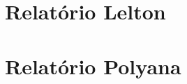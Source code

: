 %
%

\begin{anexosenv}

\chapter{Relatório Lelton}
\label{a:lelton}




\chapter{Relatório Polyana}
\label{a:polyana}




\end{anexosenv}